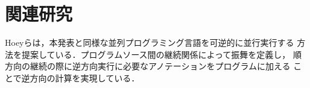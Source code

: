 \documentclass[submit,PRO]{ipsj}
\begin{document}
\section{関連研究}

Hoeyらは，本発表と同様な並列プログラミング言語を可逆的に並行実行する
方法を提案している．プログラムソース間の継続関係によって振舞を定義し，
順方向の継続の際に逆方向実行に必要なアノテーションをプログラムに加える
ことで逆方向の計算を実現している．


%
%
%
\end{document}
